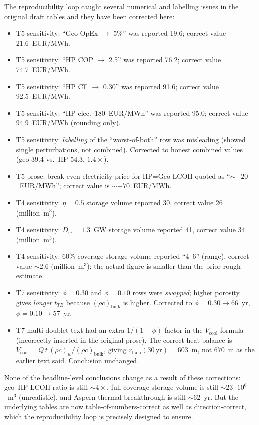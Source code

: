 \documentclass{article}
\begin{document}
The reproducibility loop caught several numerical and labelling
issues in the original draft tables and they have been corrected
here:
\begin{itemize}
\item T5 sensitivity: ``Geo OpEx $\to$ 5\%'' was reported 19.6;
correct value 21.6~EUR/MWh.
\item T5 sensitivity: ``HP COP $\to$ 2.5'' was reported 76.2;
correct value 74.7~EUR/MWh.
\item T5 sensitivity: ``HP CF $\to$ 0.30'' was reported 91.6;
correct value 92.5~EUR/MWh.
\item T5 sensitivity: ``HP elec.\ 180~EUR/MWh'' was reported 95.0;
correct value 94.9~EUR/MWh (rounding only).
\item T5 sensitivity: \emph{labelling} of the
``worst-of-both'' row was misleading (showed single perturbations,
not combined). Corrected to honest combined values
(geo 39.4 vs.\ HP 54.3, $1.4\times$).
\item T5 prose: break-even electricity price for HP=Geo LCOH
quoted as ``$\sim -20$~EUR/MWh''; correct value is
$\sim -70$~EUR/MWh.
\item T4 sensitivity: $\eta=0.5$ storage volume reported 30,
correct value 26 (million~m$^3$).
\item T4 sensitivity: $D_w = 1.3$~GW storage volume reported 41,
correct value 34 (million~m$^3$).
\item T4 sensitivity: 60\% coverage storage volume reported
``$4$--$6$'' (range), correct value $\sim 2.6$ (million~m$^3$);
the actual figure is smaller than the prior rough estimate.
\item T7 sensitivity: $\phi=0.30$ and $\phi=0.10$ rows were
\emph{swapped}; higher porosity gives \emph{longer} $t_{TB}$
because $(\rho c)_{\mathrm{bulk}}$ is higher. Corrected to
$\phi=0.30\to 66$~yr, $\phi=0.10\to 57$~yr.
\item T7 multi-doublet text had an extra $1/(1-\phi)$ factor in the
$V_{\mathrm{cool}}$ formula (incorrectly inserted in the original
prose). The correct heat-balance is
$V_{\mathrm{cool}} = Q\,t\,(\rho c)_w/(\rho c)_{\mathrm{bulk}}$, giving
$r_{\mathrm{halo}}(30\,\mathrm{yr}) = 603$~m, not $670$~m as the
earlier text said. Conclusion unchanged.
\end{itemize}
None of the headline-level conclusions change as a result of these
corrections: geo--HP LCOH ratio is still $\sim 4\times$, full-coverage
storage volume is still $\sim 23\cdot 10^6$~m$^3$ (unrealistic), and
Aspern thermal breakthrough is still $\sim 62$~yr. But the
underlying tables are now table-of-numbers-correct as well as
direction-correct, which the reproducibility loop is precisely
designed to ensure.
\end{document}
